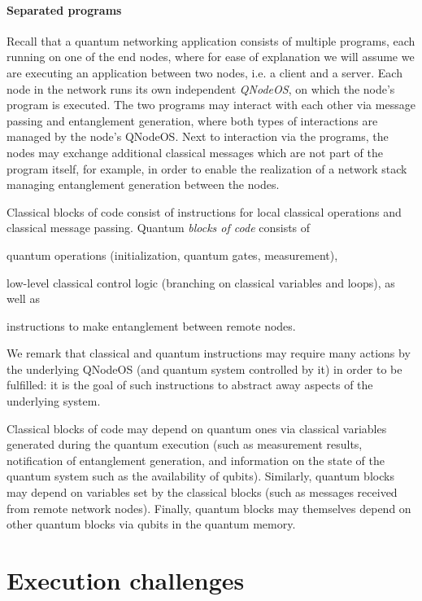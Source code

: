\paragraph{Separated programs}

Recall that a quantum networking application consists of multiple programs, each running on one of the end nodes, where for ease of explanation we will assume we are executing an application between two nodes, i.e. a client and a server. Each node in the network runs its own independent \emph{\ac{QNodeOS}}, on which the node's program is executed. The two programs may interact with each other via message passing and entanglement generation, where both types of interactions are managed by the node's \ac{QNodeOS}. Next to interaction via the programs, the nodes may exchange additional classical messages which are not part of the program itself, for example, in order to enable the realization of a network stack~\cite{dahlberg_2019_egp} managing entanglement generation between the nodes.

Classical blocks of code consist of instructions for local classical operations and classical message passing. Quantum \emph{blocks of code} consists of
%
\begin{inlinelist}
\item quantum operations (initialization, quantum gates, measurement), 
\item low-level classical control logic (branching on classical variables and loops), as well as 
\item instructions to make entanglement between remote nodes. 
\end{inlinelist}
%
We remark that classical and quantum instructions may require many actions by the underlying \ac{QNodeOS} (and quantum system controlled by it) in order to be fulfilled: it is the goal of such instructions to abstract away aspects of the underlying system.

Classical blocks of code may depend on quantum ones via classical variables generated during the quantum execution (such as measurement results, notification of entanglement generation, and information on the state of the quantum system such as the availability of qubits). Similarly, quantum blocks may depend on variables set by the classical blocks (such as messages received from remote network nodes). Finally, quantum blocks may themselves depend on other quantum blocks via qubits in the quantum memory. 


\section{Execution challenges}

